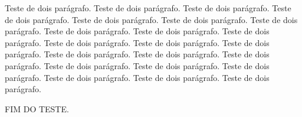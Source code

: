 \documentclass[12pt]{article}
\begin{document}
Teste de dois parágrafo. Teste de dois parágrafo. Teste de dois parágrafo. Teste de dois parágrafo. Teste de dois parágrafo. Teste de dois parágrafo. Teste de dois parágrafo. Teste de dois parágrafo. Teste de dois parágrafo. Teste de dois parágrafo. Teste de dois parágrafo. Teste de dois parágrafo. Teste de dois parágrafo. Teste de dois parágrafo. Teste de dois parágrafo. Teste de dois parágrafo. Teste de dois parágrafo. Teste de dois parágrafo. Teste de dois parágrafo. Teste de dois parágrafo. Teste de dois parágrafo. Teste de dois parágrafo.



FIM DO TESTE.
\end{document}
